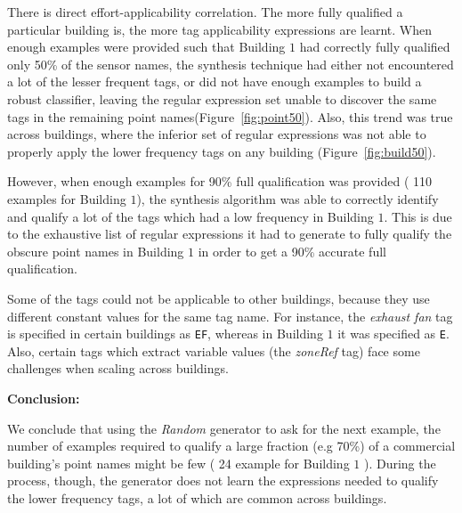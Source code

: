 There is direct effort-applicability correlation. The more fully qualified a particular building is, the more tag applicability expressions are learnt. When enough examples were provided such that Building $1$ had correctly fully qualified only 50\% of the sensor names, the synthesis technique had either not encountered a lot of the lesser frequent tags, or did not have enough examples to build a robust classifier, leaving the regular expression set unable to discover the same tags in the remaining point names(Figure~\ref{fig:point50}). Also, this trend was true across buildings, where the inferior set of regular expressions was not able to properly apply the lower frequency tags on any building (Figure~\ref{fig:build50}).

However, when enough examples for 90\% full qualification was provided ( 110 examples for Building $1$), the synthesis algorithm was able to correctly identify and qualify a lot of the tags which had a low frequency in Building $1$. This is due to the exhaustive list of regular expressions it had to generate to fully qualify the obscure point names in Building $1$ in order to get a 90\% accurate full qualification. 


Some of the tags could not be applicable to other buildings, because they use different constant values for the same tag name. For instance, the {\it exhaust fan} tag is specified in certain buildings as \texttt{EF}, whereas in Building $1$ it was specified as \texttt{E}. Also, certain tags which extract variable values (the {\it zoneRef} tag) face some challenges when scaling across buildings. 

{\bf Conclusion:}

We conclude that using the {\it Random} generator to ask for the next example, the number of examples required to qualify a large fraction (e.g 70\%) of a commercial building's point names might be few ( 24 example for Building $1$ ). During the process, though, the generator does not learn the expressions needed to qualify the lower frequency tags, a lot of which are common across buildings. 

